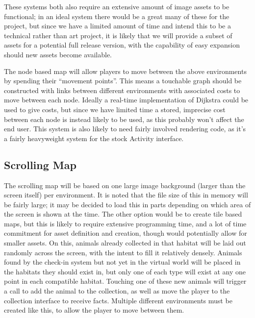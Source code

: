 \documentclass[12pt,a4paper,twoside]{article}
\begin{document}
These systems both also require an extensive amount of image assets to be functional; in an ideal system there would be a great many of these for the project, but since we have a limited amount of time and intend this to be a technical rather than art project, it is likely that we will provide a subset of assets for a potential full release version, with the capability of easy expansion should new assets become available.

The node based map will allow players to move between the above environments by spending their ``movement points''.
This means a touchable graph should be constructed with links between different environments with associated costs to move between each node.
Ideally a real-time implementation of Dijkstra could be used to give costs, but since we have limited time a stored, imprecise cost between each node is instead likely to be used, as this probably won't affect the end user.
This system is also likely to need fairly involved rendering code, as it's a fairly heavyweight system for the stock Activity interface.

\subsection{Scrolling Map}
The scrolling map will be based on one large image background (larger than the screen itself) per environment.
It is noted that the file size of this in memory will be fairly large; it may be decided to load this in parts depending on which area of the screen is shown at the time.
The other option would be to create tile based maps, but this is likely to require extensive programming time, and a lot of time commitment for asset definition and creation, though would potentially allow for smaller assets.
On this, animals already collected in that habitat will be laid out randomly across the screen, with the intent to fill it relatively densely.
Animals found by the check-in system but not yet in the virtual world will be placed in the habitats they should exist in, but only one of each type will exist at any one point in each compatible habitat.
Touching one of these new animals will trigger a call to add the animal to the collection, as well as move the player to the collection interface to receive facts.
Multiple different environments must be created like this, to allow the player to move between them.
\end{document}
